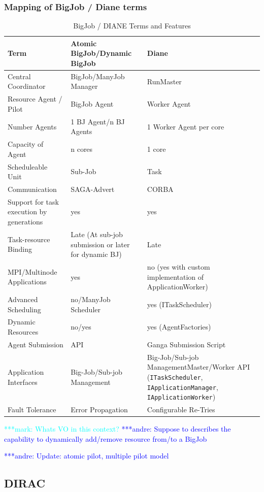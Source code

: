 \documentclass[]{article}
\newcommand{\alnote}[1]{ {\textcolor{blue} { ***andre: #1 }}}
\newcommand{\msnote}[1]{ {\textcolor{cyan} { ***mark: #1 }}}
\newcommand{\alnote}[1]{}
\begin{document}
\subsubsection{Mapping of BigJob / Diane terms}
\begin{table}[ht]
\centering
\begin{tabular}{|p{3.5cm}|p{5.9cm}|p{5.7cm}|}
\hline
\textbf{Term} &\textbf{Atomic BigJob/Dynamic BigJob} &\textbf{Diane}  \\
\hline
Central Coordinator &BigJob/ManyJob Manager & RunMaster \\ 
\hline
Resource Agent / Pilot &BigJob Agent  & Worker Agent \\
\hline
Number Agents &1 BJ Agent/n BJ Agents & 1 Worker Agent per core \\
\hline
Capacity of Agent &n cores & 1 core\\
\hline
Scheduleable Unit&Sub-Job &  Task \\
\hline
Communication &SAGA-Advert & CORBA\\
\hline
Support for task execution by generations  &yes &yes\\  
\hline
Task-resource Binding &Late (At sub-job submission or later for dynamic BJ) &Late\\
\hline
MPI/Multinode Applications &yes &no (yes with custom implementation of ApplicationWorker)\\
\hline
Advanced Scheduling &no/ManyJob Scheduler &yes (ITaskScheduler)\\
\hline
Dynamic Resources &no/yes &yes (AgentFactories)\\
\hline
Agent Submission &API &Ganga Submission Script\\
\hline
Application Interfaces &Big-Job/Sub-job Management &Big-Job/Sub-job 
Management\linebreak[4] Master/Worker API (\texttt{ITaskScheduler}, 
\texttt{IApplicationManager}, \texttt{IApplicationWorker}) \\
\hline
Fault Tolerance &Error Propagation &Configurable Re-Tries\\
\hline
\end{tabular}
\caption{BigJob / DIANE Terms and Features}
\end{table}

\msnote{Whats VO in this context?}\alnote{Suppose to describes the capability to dynamically add/remove resource from/to a BigJob}


\alnote{Update: atomic pilot, multiple pilot model}


\subsection{DIRAC}
\end{document}
